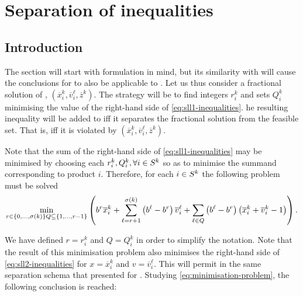 \section{Separation of inequalities} %
\label{sec:las:separation}

\newcommand{\ox}     {\overline{x}}
\newcommand{\ov}     {\overline{v}}
\newcommand{\oz}     {\overline{z}}
\newcommand{\fracsol}{$(\ox_i^k, \ov_i^\ell, \oz^k)$}

\subsection{Introduction} %
\label{ssc:las:soi:introduction}

The section will start with formulation \slla in mind, but its similarity with
\sllb will cause the conclusions for \slla to also be applicable to \sllb.  Let
us thus consider a fractional solution of \slla, \fracsol. The strategy will be
to find integers $r_i^k$ and sets $Q_i^k$ minimising the value of the right-hand
side of \eqref{eq:sll1-inequalities}. he resulting inequality will be added to
\slla iff it separates the fractional solution from the feasible set. That is,
iff it is violated by \fracsol.

Note that the sum of the right-hand side of \eqref{eq:sll1-inequalities} may be
minimised by choosing each $r_i^k, Q_i^k, \forall{\ensuremath{i \in S^k}}$ so as to minimise the
summand corresponding to product $i$. Therefore, for each ${i \in S^k}$ the following
problem must be solved
\begin{equation}
    \min_{r \in       \{0, \ldots, \sigma(k)\}\\
          Q \subseteq \{1, \ldots, r - 1\}} \left(
        b^r \ox_i^k
        + \sum_{\ell = r + 1}^{\sigma(k)}
            \left(b^\ell - b^r\right)\ov_i^\ell
        + \sum_{\ell \in Q}
            \left(b^\ell - b^r\right)\left(\ox_i^k + \ov_i^k - 1\right)
    \right).
    \label{eq:minimisation-problem}
\end{equation}

We have defined $r = r_i^k$ and $Q = Q_i^k$ in order to simplify the notation.
Note that the result of this minimisation problem also minimises the right-hand
side of \eqref{eq:sll2-inequalities} for $x = \ox_i^k$ and $v = \ov_i^\ell$.
This will permit in \sllb the same separation schema that presented for \slla.
Studying \eqref{eq:minimisation-problem}, the following conclusion is reached:

